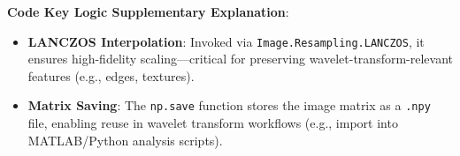 \documentclass[12pt,a4paper]{article}
\begin{document}








\textbf{Code Key Logic Supplementary Explanation}:  
\begin{itemize}
    \item \textbf{LANCZOS Interpolation}: Invoked via \texttt{Image.Resampling.LANCZOS}, it ensures high-fidelity scaling—critical for preserving wavelet-transform-relevant features (e.g., edges, textures).  
    \item \textbf{Matrix Saving}: The \texttt{np.save} function stores the image matrix as a \texttt{.npy} file, enabling reuse in wavelet transform workflows (e.g., import into MATLAB/Python analysis scripts).  
\end{itemize}
\end{document}
